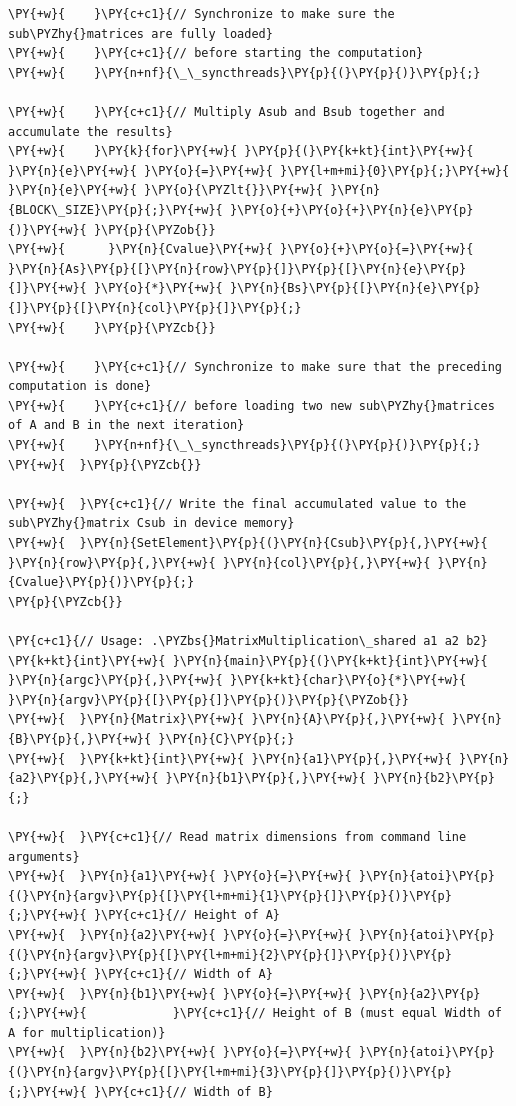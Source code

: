 \begin{Verbatim}[label=\makebox{\url{https://github.com/lucabaldini/cmepda/tree/master/slides/latex/snippets/MatrixMultiplication_shared.cu}},commandchars=\\\{\}]
\PY{+w}{    }\PY{c+c1}{// Synchronize to make sure the sub\PYZhy{}matrices are fully loaded}
\PY{+w}{    }\PY{c+c1}{// before starting the computation}
\PY{+w}{    }\PY{n+nf}{\_\_syncthreads}\PY{p}{(}\PY{p}{)}\PY{p}{;}

\PY{+w}{    }\PY{c+c1}{// Multiply Asub and Bsub together and accumulate the results}
\PY{+w}{    }\PY{k}{for}\PY{+w}{ }\PY{p}{(}\PY{k+kt}{int}\PY{+w}{ }\PY{n}{e}\PY{+w}{ }\PY{o}{=}\PY{+w}{ }\PY{l+m+mi}{0}\PY{p}{;}\PY{+w}{ }\PY{n}{e}\PY{+w}{ }\PY{o}{\PYZlt{}}\PY{+w}{ }\PY{n}{BLOCK\_SIZE}\PY{p}{;}\PY{+w}{ }\PY{o}{+}\PY{o}{+}\PY{n}{e}\PY{p}{)}\PY{+w}{ }\PY{p}{\PYZob{}}
\PY{+w}{      }\PY{n}{Cvalue}\PY{+w}{ }\PY{o}{+}\PY{o}{=}\PY{+w}{ }\PY{n}{As}\PY{p}{[}\PY{n}{row}\PY{p}{]}\PY{p}{[}\PY{n}{e}\PY{p}{]}\PY{+w}{ }\PY{o}{*}\PY{+w}{ }\PY{n}{Bs}\PY{p}{[}\PY{n}{e}\PY{p}{]}\PY{p}{[}\PY{n}{col}\PY{p}{]}\PY{p}{;}
\PY{+w}{    }\PY{p}{\PYZcb{}}

\PY{+w}{    }\PY{c+c1}{// Synchronize to make sure that the preceding computation is done}
\PY{+w}{    }\PY{c+c1}{// before loading two new sub\PYZhy{}matrices of A and B in the next iteration}
\PY{+w}{    }\PY{n+nf}{\_\_syncthreads}\PY{p}{(}\PY{p}{)}\PY{p}{;}
\PY{+w}{  }\PY{p}{\PYZcb{}}

\PY{+w}{  }\PY{c+c1}{// Write the final accumulated value to the sub\PYZhy{}matrix Csub in device memory}
\PY{+w}{  }\PY{n}{SetElement}\PY{p}{(}\PY{n}{Csub}\PY{p}{,}\PY{+w}{ }\PY{n}{row}\PY{p}{,}\PY{+w}{ }\PY{n}{col}\PY{p}{,}\PY{+w}{ }\PY{n}{Cvalue}\PY{p}{)}\PY{p}{;}
\PY{p}{\PYZcb{}}

\PY{c+c1}{// Usage: .\PYZbs{}MatrixMultiplication\_shared a1 a2 b2}
\PY{k+kt}{int}\PY{+w}{ }\PY{n}{main}\PY{p}{(}\PY{k+kt}{int}\PY{+w}{ }\PY{n}{argc}\PY{p}{,}\PY{+w}{ }\PY{k+kt}{char}\PY{o}{*}\PY{+w}{ }\PY{n}{argv}\PY{p}{[}\PY{p}{]}\PY{p}{)}\PY{p}{\PYZob{}}
\PY{+w}{  }\PY{n}{Matrix}\PY{+w}{ }\PY{n}{A}\PY{p}{,}\PY{+w}{ }\PY{n}{B}\PY{p}{,}\PY{+w}{ }\PY{n}{C}\PY{p}{;}
\PY{+w}{  }\PY{k+kt}{int}\PY{+w}{ }\PY{n}{a1}\PY{p}{,}\PY{+w}{ }\PY{n}{a2}\PY{p}{,}\PY{+w}{ }\PY{n}{b1}\PY{p}{,}\PY{+w}{ }\PY{n}{b2}\PY{p}{;}

\PY{+w}{  }\PY{c+c1}{// Read matrix dimensions from command line arguments}
\PY{+w}{  }\PY{n}{a1}\PY{+w}{ }\PY{o}{=}\PY{+w}{ }\PY{n}{atoi}\PY{p}{(}\PY{n}{argv}\PY{p}{[}\PY{l+m+mi}{1}\PY{p}{]}\PY{p}{)}\PY{p}{;}\PY{+w}{ }\PY{c+c1}{// Height of A}
\PY{+w}{  }\PY{n}{a2}\PY{+w}{ }\PY{o}{=}\PY{+w}{ }\PY{n}{atoi}\PY{p}{(}\PY{n}{argv}\PY{p}{[}\PY{l+m+mi}{2}\PY{p}{]}\PY{p}{)}\PY{p}{;}\PY{+w}{ }\PY{c+c1}{// Width of A}
\PY{+w}{  }\PY{n}{b1}\PY{+w}{ }\PY{o}{=}\PY{+w}{ }\PY{n}{a2}\PY{p}{;}\PY{+w}{            }\PY{c+c1}{// Height of B (must equal Width of A for multiplication)}
\PY{+w}{  }\PY{n}{b2}\PY{+w}{ }\PY{o}{=}\PY{+w}{ }\PY{n}{atoi}\PY{p}{(}\PY{n}{argv}\PY{p}{[}\PY{l+m+mi}{3}\PY{p}{]}\PY{p}{)}\PY{p}{;}\PY{+w}{ }\PY{c+c1}{// Width of B}


\end{Verbatim}
